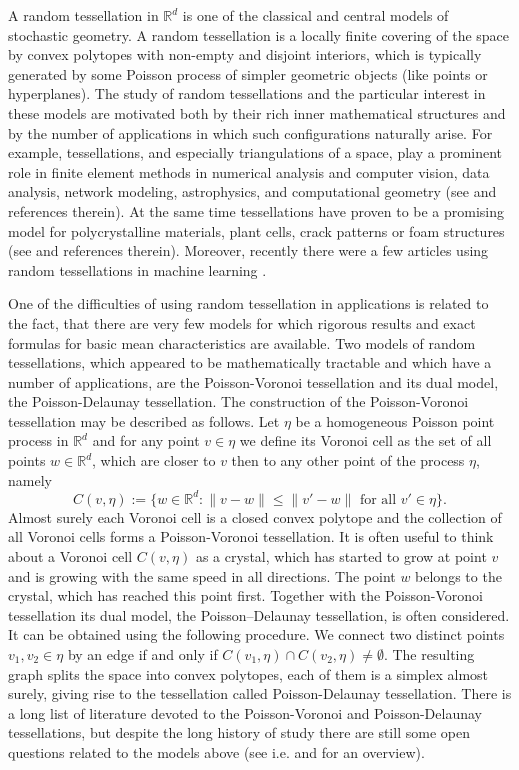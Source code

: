 \documentclass[11pt,a4paper]{article}
\theoremstyle{plain}
\theoremstyle{definition}
\theoremstyle{remark}
\def\RR{\mathbb{R}}
\begin{document}
A random tessellation in $\RR^d$ is one of the classical and central models of stochastic geometry. A random tessellation is a locally finite covering of the space by convex polytopes with non-empty and disjoint interiors, which is typically generated by some Poisson process of simpler geometric objects (like points or hyperplanes). The study of random tessellations and the particular interest in these models are motivated both by their rich inner mathematical structures and by the number of applications in which such configurations naturally arise. For example, tessellations, and especially triangulations of a space, play a prominent role in finite element methods in numerical analysis and computer vision, data analysis, network modeling, astrophysics, and computational geometry (see \cite{AKL, BY98, CSKM, OBKC} and references therein). At the same time tessellations have proven to be a promising model for polycrystalline materials, plant cells, crack patterns or foam structures (see \cite{CSKM, OBKC} and references therein). Moreover, recently there were a few articles using random tessellations in machine learning \cite{ORT24, machinelearningtess}. 

One of the difficulties of using random tessellation in applications is related to the fact, that there are very few models for which rigorous results and exact formulas for basic mean characteristics are available. Two models of random tessellations, which appeared to be mathematically tractable and which have a number of applications, are the Poisson-Voronoi tessellation and its dual model, the Poisson-Delaunay tessellation. The construction of the Poisson-Voronoi tessellation may be described as follows. Let $\eta$ be a homogeneous Poisson point process in $\RR^d$ and for any point $v\in \eta$ we define its Voronoi cell as the set of all points $w\in \RR^d$, which are closer to $v$ then to any other point of the process $\eta$, namely
\[
    C(v,\eta):=\{w\in\RR^d\colon \|v-w\|\leq \|v'-w\| \text{ for all }v'\in\eta\}.
\]
Almost surely each Voronoi cell is a closed convex polytope and the collection of all Voronoi cells forms a Poisson-Voronoi tessellation. It is often useful to think about a Voronoi cell $C(v,\eta)$ as a crystal, which has started to grow at point $v$ and is growing with the same speed in all directions. The point $w$ belongs to the crystal, which has reached this point first. Together with the Poisson-Voronoi tessellation its dual model, the Poisson–Delaunay tessellation, is often considered. It can be obtained using the following procedure. We connect two distinct points $v_1,v_2\in\eta$ by an edge if and only if $C(v_1,\eta)\cap C(v_2,\eta)\neq \emptyset$. The resulting graph splits the space into convex polytopes, each of them is a simplex almost surely, giving rise to the tessellation called Poisson-Delaunay tessellation. There is a long list of literature devoted to the Poisson-Voronoi and Poisson-Delaunay tessellations, but despite the long history of study there are still some open questions related to the models above (see i.e. \cite{CSKM} and \cite[Chapter 10]{SW} for an overview). 
\end{document}
